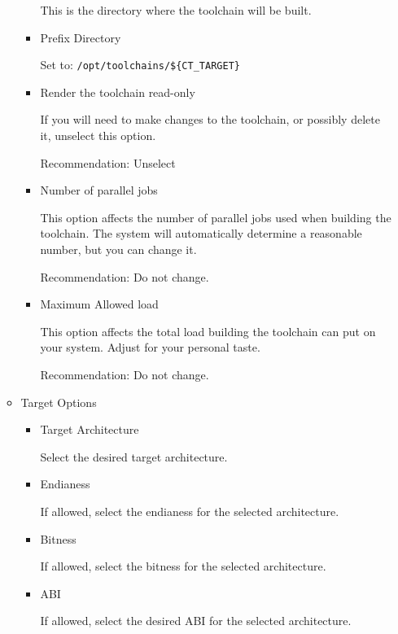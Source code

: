 \begin{enumerate}
\begin{itemize}
\begin{itemize}
        This is the directory where the toolchain will be built.

      \item{Prefix Directory}

        Set to: \texttt{/opt/toolchains/\$\{CT\_TARGET\}}

      \item{Render the toolchain read-only}

        If you will need to make changes to the toolchain, or possibly
        delete it, unselect this option.

        Recommendation: Unselect

      \item{Number of parallel jobs}

        This option affects the number of parallel jobs used when
        building the toolchain.  The system will automatically
        determine a reasonable number, but you can change it.


        Recommendation: Do not change.

      \item{Maximum Allowed load}

        This option affects the total load building the toolchain can put on
        your system.  Adjust for your personal taste.

        Recommendation: Do not change.

      \end{itemize}

    \item{Target Options}
      \begin{itemize}
      \item{Target Architecture}

        Select the desired target architecture.

      \item{Endianess}

        If allowed, select the endianess for the selected architecture.

      \item{Bitness}

        If allowed, select the bitness for the selected architecture.

      \item{ABI}

        If allowed, select the desired ABI for the selected architecture.

      \end{itemize}


\end{itemize}
\end{enumerate}
